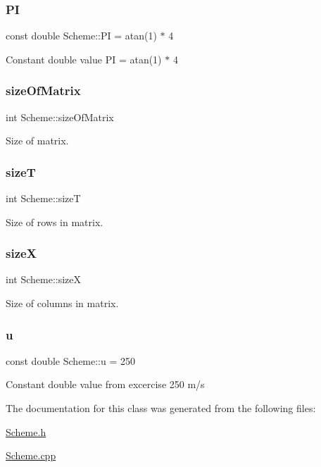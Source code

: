 \subsubsection{\texorpdfstring{PI}{PI}}
{\footnotesize\ttfamily const double Scheme\+::\+PI = atan(1) $\ast$ 4\hspace{0.3cm}{\ttfamily [protected]}}

Constant double value PI = atan(1) $\ast$ 4 \mbox{\label{class_scheme_aaa37febfb3b695d7637210b6ffdcd9ad}} 
\subsubsection{\texorpdfstring{size\+Of\+Matrix}{sizeOfMatrix}}
{\footnotesize\ttfamily int Scheme\+::size\+Of\+Matrix\hspace{0.3cm}{\ttfamily [protected]}}

Size of matrix. \mbox{\label{class_scheme_a04f4e41aaa2bffd82b9027550f8374f0}} 
\subsubsection{\texorpdfstring{sizeT}{sizeT}}
{\footnotesize\ttfamily int Scheme\+::sizeT\hspace{0.3cm}{\ttfamily [protected]}}

Size of rows in matrix. \mbox{\label{class_scheme_a34d6e438fa45638221f250c9aa7acde1}} 
\subsubsection{\texorpdfstring{sizeX}{sizeX}}
{\footnotesize\ttfamily int Scheme\+::sizeX\hspace{0.3cm}{\ttfamily [protected]}}

Size of columns in matrix. \mbox{\label{class_scheme_a512873bf3cd534832300046f1a1792a3}} 
\subsubsection{\texorpdfstring{u}{u}}
{\footnotesize\ttfamily const double Scheme\+::u = 250\hspace{0.3cm}{\ttfamily [protected]}}

Constant double value from excercise 250 m/s 

The documentation for this class was generated from the following files\+:\begin{DoxyCompactItemize}
\item 
\mbox{\hyperlink{_scheme_8h}{Scheme.\+h}}\item 
\mbox{\hyperlink{_scheme_8cpp}{Scheme.\+cpp}}\end{DoxyCompactItemize}
